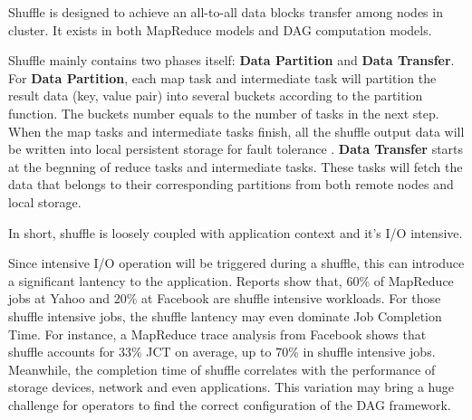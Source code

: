 \documentclass[10pt,twocolumn]{article}
\begin{document}
Shuffle is designed to achieve an all-to-all data blocks transfer among nodes in cluster. It exists in both MapReduce models and DAG computation models.

Shuffle mainly contains two phases itself: \textbf{Data Partition} and \textbf{Data Transfer}. For \textbf{Data Partition}, each map task and intermediate task will partition the result data (key, value pair) into several buckets according to the partition function.
The buckets number equals to the number of tasks in the next step. When the map tasks and intermediate tasks finish, all the shuffle output data will be written into local persistent storage for fault tolerance \cite{mapreduce, spark}.
\textbf{Data Transfer} starts at the begnning of reduce tasks and intermediate tasks. These tasks will fetch the data that belongs to their corresponding partitions from both remote nodes and local storage.

In short, shuffle is loosely coupled with application context and it's I/O intensive.

Since intensive I/O operation will be triggered during a shuffle, this can introduce a significant lantency to the application. Reports show that, 60\% of MapReduce jobs at Yahoo
and 20\% at Facebook are shuffle intensive workloads\cite{shufflewatcher}. For those shuffle intensive jobs, the shuffle lantency may even dominate Job Completion Time. 
For instance, a MapReduce trace analysis from Facebook shows that shuffle accounts for 33\% JCT on average, up to 70\% in shuffle intensive jobs\cite{managing}.
Meanwhile, the completion time of shuffle correlates with the performance of storage devices, network and even applications. 
This variation may bring a huge challenge for operators to find the correct configuration of the DAG framework.
\end{document}
